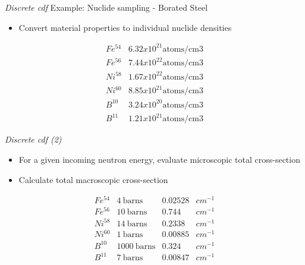 \emph{Discrete cdf}
 Example: Nuclide sampling - Borated Steel
  \begin{itemize}
    \item Convert material properties to individual nuclide densities
  \end{itemize}
     \begin{displaymath}
        \left. \begin{array}{ll}
               Fe^{54}  & 6.32x10^{21} \textrm{atoms/cm3}\\
               Fe^{56}  & 7.44x10^{22} \textrm{atoms/cm3}\\
               Ni^{58}  & 1.67x10^{22} \textrm{atoms/cm3}\\
               Ni^{60}  & 8.85x10^{21} \textrm{atoms/cm3}\\
               B^{10}  & 3.24x10^{20} \textrm{atoms/cm3}\\
               B^{11}  & 1.21x10^{21} \textrm{atoms/cm3}
                       \end{array} \right.
  \end{displaymath}


\emph{Discrete cdf (2)}
  \begin{itemize}
    \item For a given incoming neutron energy, evaluate microscopic total cross-section
    \item Calculate total macroscopic cross-section
  \end{itemize}
     \begin{displaymath}
        \left. \begin{array}{llll}
               Fe^{54}  & 4 \: \textrm{barns} & 0.02528 & cm^{-1}\\
               Fe^{56}  & 10 \: \textrm{barns} &  0.744 & cm^{-1}\\
               Ni^{58}  & 14 \: \textrm{barns} & 0.2338 & cm^{-1}\\
               Ni^{60}  & 1 \: \textrm{barns} & 0.00885 & cm^{-1}\\
               B^{10}  & 1000 \: \textrm{barns} & 0.324 & cm^{-1}\\
               B^{11}  & 7 \: \textrm{barns} & 0.00847 & cm^{-1}
                       \end{array} \right.
  \end{displaymath}  


